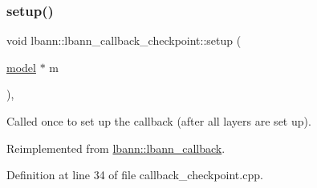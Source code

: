\subsubsection{\texorpdfstring{setup()}{setup()}}
{\footnotesize\ttfamily void lbann\+::lbann\+\_\+callback\+\_\+checkpoint\+::setup (\begin{DoxyParamCaption}\item[{\hyperlink{classlbann_1_1model}{model} $\ast$}]{m }\end{DoxyParamCaption})\hspace{0.3cm}{\ttfamily [override]}, {\ttfamily [virtual]}}

Called once to set up the callback (after all layers are set up). 

Reimplemented from \hyperlink{classlbann_1_1lbann__callback_aab5086e27d9bb0a7c7ee8ffc1bc58671}{lbann\+::lbann\+\_\+callback}.



Definition at line 34 of file callback\+\_\+checkpoint.\+cpp.


